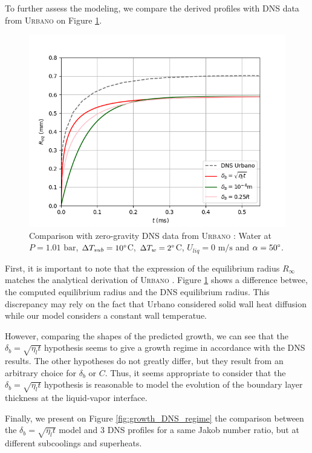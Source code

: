 To further assess the modeling, we compare the derived profiles with DNS data from \textsc{Urbano} \etal\cite{Urbano2018} on Figure \ref{fig:growth_vs_DNS}.


\begin{figure}[h!]
\centering
\includegraphics[width=0.7\linewidth]{img/growth/modvsDNS.png}
\caption{Comparison with zero-gravity DNS data from \textsc{Urbano} \etal : Water at $P=1.01\text{~bar}$, $\Delta T_{sub}=10\degree$C, $\Delta T_{w}=2\degree$C, $U_{liq}=0\text{~m/s}$ and $\alpha=50\degree$.}
\label{fig:growth_vs_DNS}
\end{figure}


\npar
First, it is important to note that the expression of the equilibrium radius $R_{\infty}$ matches the analytical derivation of \textsc{Urbano} \etal. Figure \ref{fig:growth_vs_DNS} shows a difference betwee, the computed equilibrium radius and the DNS equilibrium radius. This discrepancy may rely on the fact that Urbano \etal considered solid wall heat diffusion while our model considers a constant wall temperatue.

However, comparing the shapes of the predicted growth, we can see that the $\delta_{b}=\sqrt{\eta_{l}t}$ hypothesis seems to give a growth regime in accordance with the DNS results. The other hypotheses do not greatly differ, but they result from an arbitrary choice for $\delta_{b}$ or $C$. Thus, it seems appropriate to consider that the $\delta_{b}=\sqrt{\eta_{l}t}$ hypothesis is reasonable to model the evolution of the boundary layer thickness at the liquid-vapor interface.

\npar


Finally, we present on Figure \ref{fig:growth_DNS_regime} the comparison between the $\delta_{b}=\sqrt{\eta_{l}t}$ model and 3 DNS profiles for a same Jakob number ratio, but at different subcoolings and superheats. 


